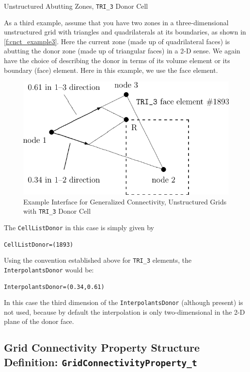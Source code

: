 \begin{example}{Unstructured Abutting Zones, \texttt{TRI\_3} Donor Cell}
\label{ex:unstruct_abut2}

As a third example, assume that you have two zones in a
three-dimensional unstructured grid with triangles and quadrilaterals at
its boundaries, as shown in \autoref{f:cnct_example3}.
Here the current zone (made up of quadrilateral faces) is abutting the
donor zone (made up of triangular faces) in a 2-D sense.
We again have the choice of describing the donor in terms of its volume
element or its boundary (face) element.
Here in this example, we use the face element.

\begin{figure}[!htb]
   \centering
   \includegraphics{cnct.figs/cnct_example3}
   \caption{Example Interface for Generalized Connectivity, Unstructured
            Grids with \texttt{TRI\_3} Donor Cell}
   \label{f:cnct_example3}
\end{figure}

The \texttt{CellListDonor} in this case is simply given by
\begin{alltt}
   CellListDonor = (1893)
\end{alltt}
Using the convention established above for \texttt{TRI\_3} elements, the
\texttt{InterpolantsDonor} would be:
\begin{alltt}
   InterpolantsDonor = (0.34, 0.61)
\end{alltt}
In this case the third dimension of the \texttt{InterpolantsDonor}
(although present) is not used, because by default the interpolation is
only two-dimensional in the 2-D plane of the donor face.
\end{example}

\subsection{Grid Connectivity Property Structure Definition: \texttt{GridConnectivityProperty\_t}}
\label{s:GridConnectivityProperty}

